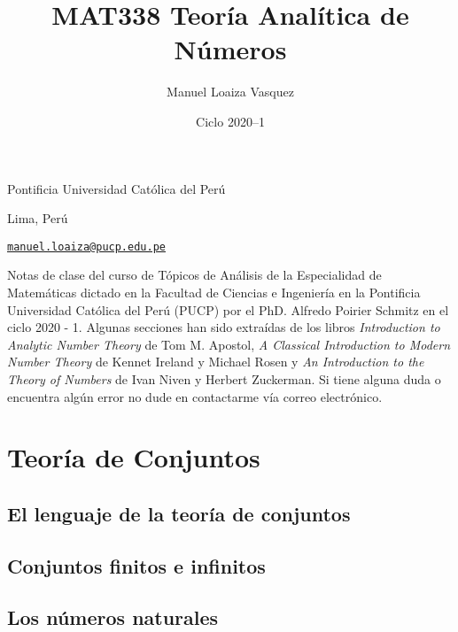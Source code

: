\documentclass{article}
\title{MAT338 Teor\'ia Anal\'itica de N\'umeros} %
\author{Manuel Loaiza Vasquez}
\date{Ciclo 2020--1}
\theoremstyle{definition}
\theoremstyle{remark}
\begin{document}
\maketitle

\vspace*{-0.25in}
\centerline{Pontificia Universidad Cat\'olica del Per\'u}
\centerline{Lima, Per\'u}
\centerline{\href{mailto:manuel.loaiza@pucp.edu.pe}{{\tt manuel.loaiza@pucp.edu.pe}}}
\vspace*{0.15in}

\begin{framed}
    Notas de clase del curso de T\'opicos de An\'alisis de la Especialidad de Matem\'aticas dictado en la Facultad de Ciencias e Ingenier\'ia en la Pontificia Universidad Cat\'olica del Per\'u (PUCP) por el PhD. Alfredo Poirier Schmitz en el ciclo 2020 - 1. Algunas secciones han sido extra\'idas de los libros {\it Introduction to Analytic Number Theory} de Tom M. Apostol, {\it A Classical Introduction to Modern Number Theory} de Kennet Ireland y Michael Rosen y {\it An Introduction to the Theory of Numbers} de Ivan Niven y Herbert Zuckerman. Si tiene alguna duda o encuentra alg\'un error no dude en contactarme v\'ia correo electr\'onico.
\end{framed}

\tableofcontents

\newpage
\section{Teor\'ia de Conjuntos}
\subsection{El lenguaje de la teor\'ia de conjuntos}


\subsection{Conjuntos finitos e infinitos}


\subsection{Los n\'umeros naturales}

\end{document}
